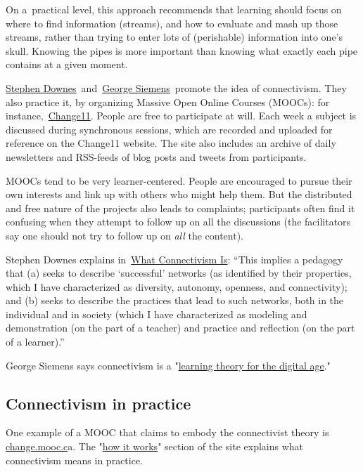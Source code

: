 On a~practical level, this approach recommends that learning should
focus on where to find information (streams), and how to evaluate and
mash up those streams, rather than trying to enter lots of (perishable)
information into one's skull. Knowing the pipes is more important than
knowing what exactly each pipe contains at a given moment.

\href{http://en.wikipedia.org/wiki/Stephen\_Downes}{Stephen
Downes}~and~\href{http://en.wikipedia.org/wiki/George\_Siemens}{George
Siemens}~promote the idea of connectivism. They also practice it, by
organizing Massive Open Online Courses (MOOCs): for
instance,~\href{http://change.mooc.ca/about.htm}{Change11}. People are
free to participate at will. Each week a subject is discussed during
synchronous sessions, which are recorded and uploaded for reference on
the Change11 website. The site also includes an archive of daily
newsletters and RSS-feeds of blog posts and tweets from participants.

MOOCs tend to be very learner-centered. People are encouraged to pursue
their own interests and link up with others who might help them. But the
distributed and free nature of the projects also leads to complaints;
participants often find it confusing when they attempt to follow up on
all the discussions (the facilitators say one should not try to follow
up on \emph{all} the content).

Stephen Downes explains
in~\href{http://halfanhour.blogspot.com/2007/02/what-connectivism-is.html}{What
Connectivism Is}: ``This implies a pedagogy that (a) seeks to describe
`successful' networks (as identified by their properties, which I have
characterized as diversity, autonomy, openness, and connectivity); and
(b) seeks to describe the practices that lead to such networks, both in
the individual and in society (which I have characterized as modeling
and demonstration (on the part of a teacher) and practice and reflection
(on the part of a learner).''

George Siemens says connectivism is a
"\href{http://www.itdl.org/Journal/Jan\_05/article01.htm}{learning
theory for the digital age}."

\subsection{Connectivism in practice}

One example of a MOOC that claims to embody the connectivist theory is
\href{http://change.mooc.ca/index.html}{change.mooc.c}a. The
"\href{http://change.mooc.ca/how.htm}{how it works}" section of the site
explains what connectivism means in practice.

